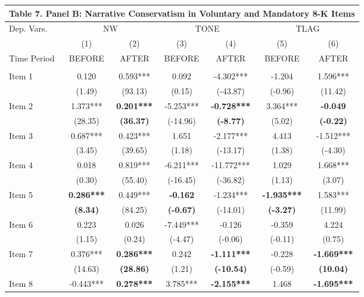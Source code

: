 \begin{table}[H] \label{T7PB}
  \centering
    \begin{tabular}{lcccccc}
    \multicolumn{7}{c}{\textbf{Table 7. Panel B: Narrative Conservatism in Voluntary and Mandatory 8-K Items}} \\
    \midrule
    \midrule
    Dep. Vars. & \multicolumn{2}{c}{NW} & \multicolumn{2}{c}{TONE} & \multicolumn{2}{c}{TLAG} \\
    \cmidrule{2-7}
    & (1) & (2) & (3) & (4) & (5) & (6) \\
    Time Period & BEFORE & AFTER & BEFORE & AFTER & BEFORE & AFTER \\
    \midrule
      &   &   &   &   &   &  \\
    Item 1 & 0.120 & 0.593*** & 0.092 & -4.302*** & -1.204 & 1.596*** \\
      & (1.49) & (93.13) & (0.15) & (-43.87) & (-0.96) & (11.42) \\
    Item 2 & 1.373*** & \textbf{0.201***} & -5.253*** & \textbf{-0.728***} & 3.364*** & \textbf{-0.049} \\
      & (28.35) & \textbf{(36.37)} & (-14.96) & \textbf{(-8.77)} & (5.02) & \textbf{(-0.22)} \\
    Item 3 & 0.687*** & 0.423*** & 1.651 & -2.177*** & 4.413 & -1.512*** \\
      & (3.45) & (39.65) & (1.18) & (-13.17) & (1.38) & (-4.30) \\
    Item 4 & 0.018 & 0.819*** & -6.211*** & -11.772*** & 1.029 & 1.668*** \\
      & (0.30) & (55.40) & (-16.45) & (-36.82) & (1.13) & (3.07) \\
    Item 5 & \textbf{0.286***} & 0.449*** & \textbf{-0.162} & -1.234*** & \textbf{-1.935***} & 1.583*** \\
      & \textbf{(8.34)} & (84.25) & \textbf{(-0.67)} & (-14.01) & \textbf{(-3.27)} & (11.99) \\
    Item 6 & 0.223 & 0.026 & -7.449*** & -0.126 & -0.359 & 4.224 \\
      & (1.15) & (0.24) & (-4.47) & (-0.06) & (-0.11) & (0.75) \\
    Item 7 & 0.376*** & \textbf{0.286***} & 0.242 & \textbf{-1.111***} & -0.228 & \textbf{-1.669***} \\
      & (14.63) & \textbf{(28.86)} & (1.21) & \textbf{(-10.54)} & (-0.59) & \textbf{(10.04)} \\
    Item 8 & -0.443*** & \textbf{0.278***} & 3.785*** & \textbf{-2.155***} & 1.468 & \textbf{-1.695***} \\

\end{tabular}
\end{table}
